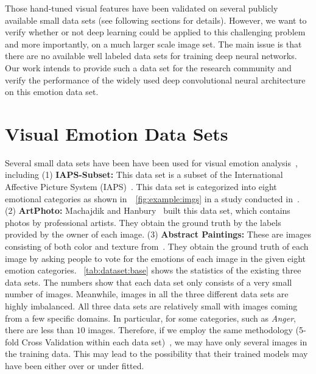 \documentclass[letterpaper]{article}
\begin{document}
Those hand-tuned visual features have been validated on several publicly available small data sets (see following sections for details). However, we want to verify whether or not deep learning could be applied to this challenging problem and more importantly, on a much larger scale image set. The main issue is that there are no available well labeled data sets for training deep neural networks. Our work intends to provide such a data set for the research community and verify the performance of the widely used deep convolutional neural architecture on this emotion data set.
\section{Visual Emotion Data Sets}
\label{sec:dataset}

Several small data sets have been have been used for visual emotion analysis~\cite{yanulevskaya2008emotional,machajdik2010affective,Zhao:2014:EPF:2647868.2654930}, including (1) \textbf{IAPS-Subset:} This data set is a subset of the International Affective Picture System (IAPS)~\cite{lang1999international}. This data set is categorized into eight emotional categories as shown in~\figurename~\ref{fig:example:imgs} in a study conducted in~\cite{mikels2005emotional}. (2) \textbf{ArtPhoto:} Machajdik and Hanbury~ built this data set, which contains photos by professional artists. They obtain the ground truth by the labels provided by the owner of each image. (3) \textbf{Abstract Paintings:} These are images consisting of both color and texture from~\cite{machajdik2010affective}. They obtain the ground truth of each image by asking people to vote for the emotions of each image in the given eight emotion categories. \tablename~\ref{tab:dataset:base} shows the statistics of the existing three data sets. The numbers show that each data set only consists of a very small number of images. Meanwhile, images in all the three different data sets are highly imbalanced. All three data sets are relatively small with images coming from a few specific domains. In particular, for some categories, such as \textit{Anger}, there are less than $10$ images. Therefore, if we employ the same methodology (5-fold Cross Validation within each data set)~\cite{machajdik2010affective,Zhao:2014:EPF:2647868.2654930}, we may have only several images in the training data. This may lead to the possibility that their trained models may have been either over or under fitted.
\end{document}
